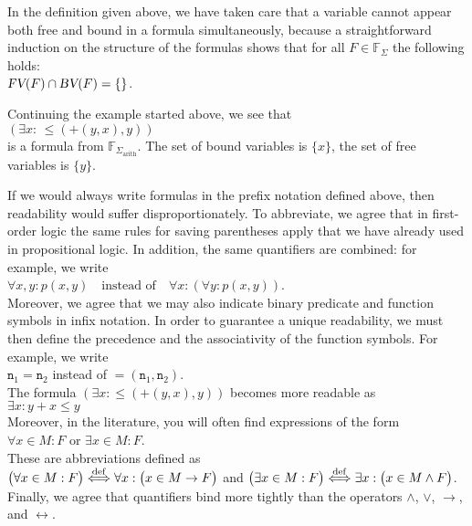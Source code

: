 In the definition given above, we have taken care that a variable cannot appear both free and bound in a
formula simultaneously, because a straightforward induction on the structure of the formulas shows that for all 
$F \in \mathbb{F}_\Sigma$ the following holds:  
\\[0.2cm]
\hspace*{1.3cm}
$ \textsl{FV}(F) \cap \textsl{BV}(F) = \{\}$. 

\exampleEng
Continuing the example started above, we see that \\[0.2cm]
\hspace*{1.3cm} $(\exists x \colon\, \leq\!(\mathtt{+}(y, x),y))$ \\[0.2cm]
is a formula from $\mathbb{F}_{\Sigma_{\mathrm{arith}}}$. 
The set of bound variables is $\{x\}$, the set of free variables is 
$\{ y \}$. \eox

If we would always write formulas in the prefix notation defined above, then readability would suffer
disproportionately.  
To abbreviate, we agree that in first-order logic the same rules for saving parentheses apply that we have
already used in propositional logic. In addition, the same quantifiers are combined: for example, we write   
\\[0.2cm]
\hspace*{1.3cm}
$\forall x, y \colon p(x, y)  \quad \text{instead of} \quad \forall x \colon ( \forall y \colon p(x,y))$.
\\[0.2cm]
Moreover, we agree that we may also indicate binary predicate and function symbols in infix notation.
In order to guarantee a unique readability, we must then define the precedence and the associativity of the
function symbols.  For example, we write \\[0.2cm]
\hspace*{1.3cm} $\mathtt{n}_1 = \mathtt{n}_2$  \quad instead of \quad $=(\mathtt{n}_1, \mathtt{n}_2)$. \\[0.2cm]
The formula $(\exists x \colon \leq(\mathtt{+}(y, x),y))$ becomes more readable as \\[0.2cm]
\hspace*{1.3cm} $\exists x \colon y + x \leq y$ \\[0.2cm]
Moreover, in the literature, you will often find expressions of the form
\\[0.2cm]
\hspace*{1.3cm}
$\forall x \in M: F$ \quad or \quad $\exists x \in M: F$.
\\[0.2cm]
These are abbreviations defined as
\\[0.2cm]
\hspace*{1.3cm}
$\displaystyle \bigl(\forall x \in M: F\bigr) \stackrel{\mathrm{def}}{\Longleftrightarrow} \forall x: \bigl(x \in M \rightarrow F\bigr)$
\quad and \quad 
$\displaystyle\bigl(\exists x \in M: F\bigr) \stackrel{\mathrm{def}}{\Longleftrightarrow} \exists x: \bigl(x \in M \wedge F\bigr)$.
\\[0.2cm]
Finally, we agree that quantifiers bind more tightly than the operators $\wedge$, $\vee$, $\rightarrow$, and
$\leftrightarrow$. 

